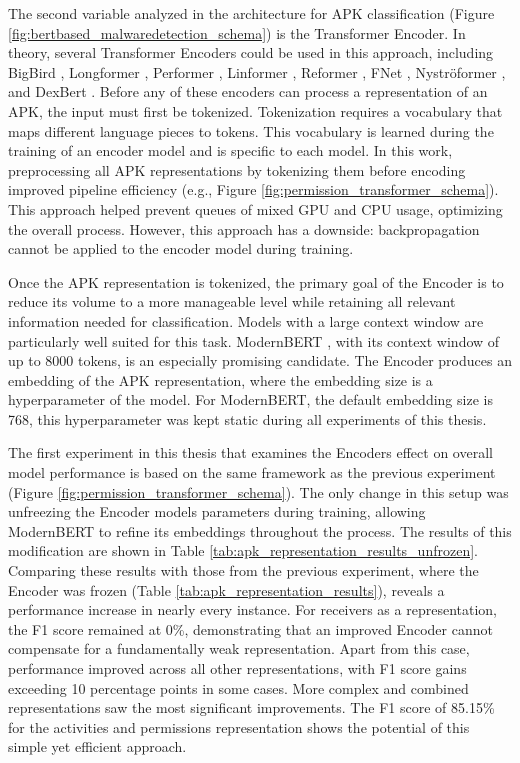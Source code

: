 The second variable analyzed in the architecture for APK classification (Figure \ref{fig:bertbased_malwaredetection_schema}) 
is the Transformer Encoder.
In theory, several Transformer Encoders could be used in this approach, 
including BigBird \cite{bigbird}, Longformer \cite{longformer}, Performer \cite{performer}, 
Linformer \cite{linformer}, Reformer \cite{reformer}, FNet \cite{fnet}, Nyströformer \cite{nystromformer}, 
and DexBert \cite{dexbert}.
Before any of these encoders can process a representation of an APK, the input must first be tokenized.
Tokenization requires a vocabulary that maps different language pieces to tokens.
This vocabulary is learned during the training of an encoder model and is specific to each model.
In this work, preprocessing all APK representations by tokenizing them before encoding improved pipeline efficiency 
(e.g., Figure \ref{fig:permission_transformer_schema}).
This approach helped prevent queues of mixed GPU and CPU usage, optimizing the overall process.
However, this approach has a downside: backpropagation cannot be applied to the encoder model during training.

Once the APK representation is tokenized, the primary goal of the Encoder is to reduce its volume to a more manageable 
level while retaining all relevant information needed for classification.
Models with a large context window are particularly well suited for this task.
ModernBERT \cite{modernbert}, with its context window of up to 8000 tokens, is an especially promising candidate.
The Encoder produces an embedding of the APK representation, where the embedding size is a hyperparameter of the model.
For ModernBERT, the default embedding size is 768, this hyperparameter was kept static during all experiments of this thesis.

The first experiment in this thesis that examines the Encoders effect on overall model performance 
is based on the same framework as the previous experiment (Figure \ref{fig:permission_transformer_schema}).
The only change in this setup was unfreezing the Encoder models parameters during training, 
allowing ModernBERT to refine its embeddings throughout the process.
The results of this modification are shown in Table \ref{tab:apk_representation_results_unfrozen}.
Comparing these results with those from the previous experiment, where the Encoder was frozen 
(Table \ref{tab:apk_representation_results}), reveals a performance increase in nearly every instance.
For receivers as a representation, the F1 score remained at 0\%, 
demonstrating that an improved Encoder cannot compensate for a fundamentally weak representation.
Apart from this case, performance improved across all other representations, 
with F1 score gains exceeding 10 percentage points in some cases.
More complex and combined representations saw the most significant improvements.
The F1 score of 85.15\% for the activities and permissions representation 
shows the potential of this simple yet efficient approach.

